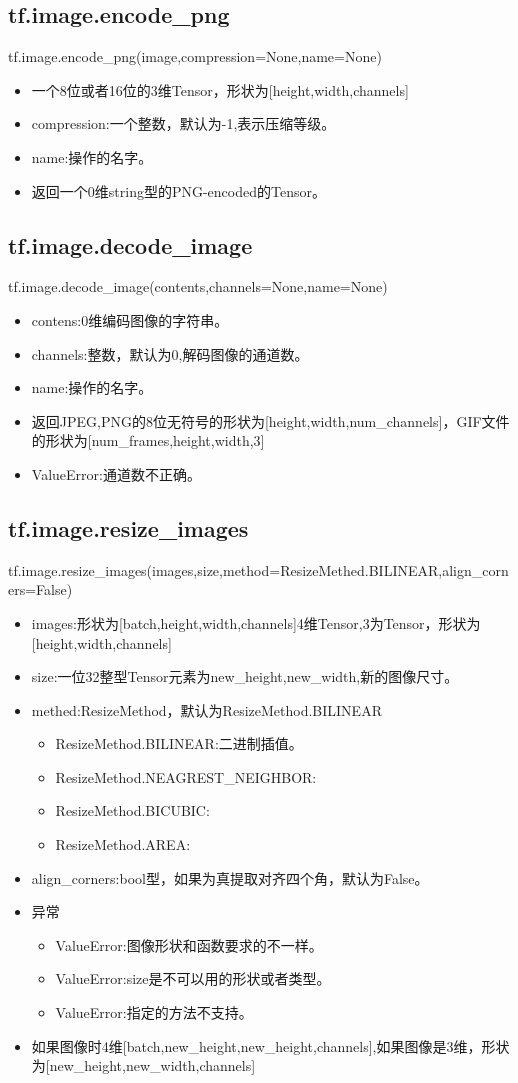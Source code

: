 \subsection{tf.image.encode\_png}
tf.image.encode\_png(image,compression=None,name=None)
\begin{itemize}
	\item 一个8位或者16位的3维Tensor，形状为[height,width,channels]
	\item compression:一个整数，默认为-1,表示压缩等级。
	\item name:操作的名字。
	\item 返回一个0维string型的PNG-encoded的Tensor。
\end{itemize}
\subsection{tf.image.decode\_image}
tf.image.decode\_image(contents,channels=None,name=None)
\begin{itemize}
	\item contens:0维编码图像的字符串。
	\item channels:整数，默认为0,解码图像的通道数。
	\item name:操作的名字。
	\item 返回JPEG,PNG的8位无符号的形状为[height,width,num\_channels]，GIF文件的形状为[num\_frames,height,width,3]
	\item ValueError:通道数不正确。
\end{itemize}
\subsection{tf.image.resize\_images}
tf.image.resize\_images(images,size,method=ResizeMethed.BILINEAR,align\_corners=False)
\begin{itemize}
	\item images:形状为[batch,height,width,channels]4维Tensor,3为Tensor，形状为[height,width,channels]
	\item size:一位32整型Tensor元素为new\_height,new\_width,新的图像尺寸。
	\item methed:ResizeMethod，默认为ResizeMethod.BILINEAR
		\begin{itemize}
			\item ResizeMethod.BILINEAR:二进制插值。
			\item ResizeMethod.NEAGREST\_NEIGHBOR:
			\item ResizeMethod.BICUBIC:
			\item ResizeMethod.AREA:
		\end{itemize}
	\item align\_corners:bool型，如果为真提取对齐四个角，默认为False。
	\item 异常
		\begin{itemize}
			\item ValueError:图像形状和函数要求的不一样。
			\item ValueError:size是不可以用的形状或者类型。
			\item ValueError:指定的方法不支持。
		\end{itemize}
	\item 如果图像时4维[batch,new\_height,new\_height,channels],如果图像是3维，形状为[new\_height,new\_width,channels]
\end{itemize}
